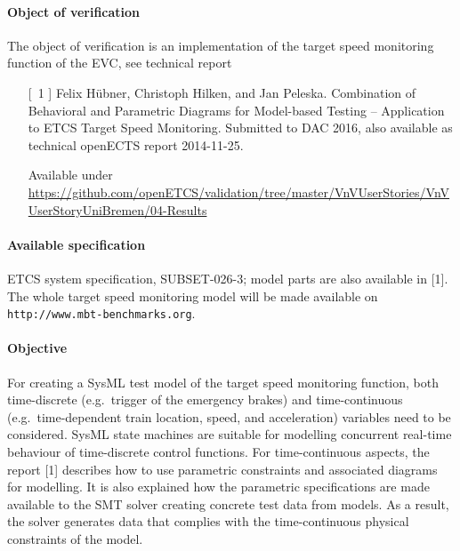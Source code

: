\paragraph{Object of verification}

The object of verification is an implementation of the target speed monitoring function of the EVC,
see technical report
\begin{itemize}
\item[[~1]] Felix H{\"u}bner, Christoph Hilken, and Jan Peleska.
Combination of Behavioral and Parametric Diagrams for Model-based
Testing -- Application to ETCS Target Speed Monitoring. Submitted to DAC 2016, also available as 
technical openECTS report 2014-11-25.

Available under \url{https://github.com/openETCS/validation/tree/master/VnVUserStories/VnVUserStoryUniBremen/04-Results}
\end{itemize}


\paragraph{Available specification}
ETCS system specification, SUBSET-026-3;
model parts are also available in [1]. The whole target speed monitoring model will be made available on {\tt http://www.mbt-benchmarks.org}.

\paragraph{Objective}
For creating a SysML test model of the target speed monitoring function, both time-discrete
(e.g.~trigger of the emergency brakes) and time-continuous (e.g.~time-dependent 
train location, speed, and acceleration) variables 
need to be considered. SysML state machines
are suitable for modelling concurrent real-time behaviour of time-discrete control
functions. For time-continuous aspects, the report [1] describes how to use
parametric constraints and associated diagrams for modelling. It is also explained
how the parametric specifications are made available to the SMT solver creating 
concrete test data from models. As a result, the solver generates data that 
complies with the time-continuous physical constraints of the model. 


